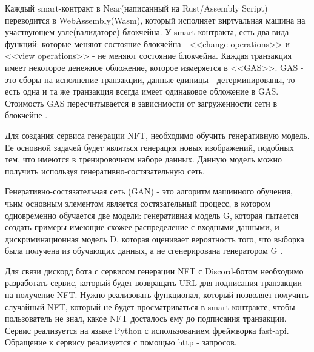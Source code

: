 \begin{remark}
    Каждый smart-контракт в Near(написанный на Rust/Assembly Script) переводится в WebAssembly(Wasm), который исполняет виртуальная машина на участвующем узле(валидаторе) блокчейна. У smart-контракта, есть два вида функций: которые меняют состояние блокчейна - <<change operations>> и <<view operations>> - не меняют состояние блокчейна. Каждая транзакция имеет некоторое денежное обложение, которое измеряется в <<GAS>>. GAS - это сборы на исполнение транзакции, данные единицы - детерминированы, то есть одна и та же транзакция всегда имеет одинаковое обложение в GAS. Стоимость GAS пересчитывается в зависимости от загруженности сети в блокчейне \cite{neargas}.
\end{remark}

Для создания сервиса генерации NFT, необходимо обучить генеративную модель. Ее основной задачей будет являться генерация новых изображений, подобных тем, что имеются в тренировочном наборе данных. Данную модель можно получить используя генеративно-состязательную сеть.


\begin{definition}
    Генеративно-состязательная сеть (GAN) - это алгоритм машинного обучения, чьим основным элементом является состязательный процесс, в котором одновременно обучается две модели: генеративная модель G, которая пытается создать примеры имеющие схожее распределение с входными данными, и дискриминационная модель D, которая оценивает вероятность того, что выборка была получена из обучающих данных, а не сгенерирована генератором G \cite{generative_adversial_network}.
\end{definition}

Для связи дискорд бота с сервисом генерации NFT  с Discord-ботом необходимо разработать сервис, который будет возвращать URL для подписания транзакции на получение NFT. Нужно реализовать функционал, который позволяет получить случайный NFT, который не будет просматриваться в smart-контракте, чтобы пользователь не знал, какое NFT досталось ему до подписания транзакции. Сервис реализуется на языке Python с использованием фреймворка fast-api. Обращение к сервису реализуется с помощью http - запросов.


